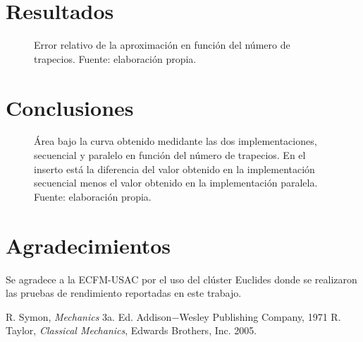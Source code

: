 \section{Resultados}
\label{sec:resultados}
\lipsum[1-2]

\begin{figure}[H]
  \centering
  \caption{Error relativo de la aproximación en función del número de
    trapecios. Fuente: elaboración propia.}
  \label{fig:Serror}
\end{figure}

\lipsum[1-2]



\section{Conclusiones}
\label{sec:conclusiones}

\lipsum[1-2]

\begin{figure}[H]
  \centering
  \caption{Área bajo la curva obtenido medidante las dos implementaciones,
    secuencial y paralelo en función del número de trapecios.  En el inserto
    está la diferencia del valor obtenido en la implementación secuencial
    menos el valor obtenido en la implementación paralela.  Fuente:
    elaboración propia.}
  \label{fig:Merror}
\end{figure}


\lipsum[1-2]

\section*{Agradecimientos}
\label{sec:agradecimientos}

Se agradece a la ECFM-USAC por el uso del clúster Euclides donde se realizaron
las pruebas de rendimiento reportadas en este trabajo.

\nocite{*}
%
%

\begin{thebibliography}{00}
 R. Symon, \textit{Mechanics} 3a. Ed. Addison$-$Wesley Publishing Company, 1971
 R. Taylor, \textit{Classical Mechanics}, Edwards Brothers, Inc. 2005.
\end{thebibliography}






